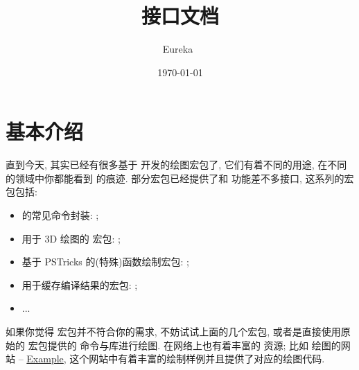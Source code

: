 \documentclass[
  hyper, 
  lang = cn, 
  class = l3doc,
  classOption={11pt},
  sect = {load=false},
]{../../zlatex/code/ztex}
\title{\texorpdfstring{\ztikz{}}{zTikZ} 接口文档}
\author{Eureka~\rlap{\wscale*{7.5em}{\normalfont\small\sffamily\color{gray}zongpingding5(at)outlook(dot)com}}}
\date{\textsf{\today}}
\begin{document}
\ExplSyntaxOn
{}
\ExplSyntaxOff
{}
  \maketitle
\restoregeometry
\restoregeometry
\fancyheadoffset{0pt}

\section{基本介绍}
直到今天, 其实已经有很多基于  开发的绘图宏包了, 它们有着不同的用途, 在不同的领域中你都能看到 \TikZ{} 的痕迹. 
部分宏包已经提供了和  功能差不多接口, 这系列的宏包包括:
\begin{itemize}
  \item  \TikZ{} 的常见命令封装: \href{https://ctan.org/tex-archive/graphics/pgf/contrib/tzplot}{};
  \item 用于 3D 绘图的 \TikZ{} 宏包: \href{https://ctan.org/pkg/tikz-3dplot}{};
  \item 基于 PSTricks 的(特殊)函数绘制宏包: \href{https://ctan.org/pkg/pst-func}{};
  \item 用于缓存编译结果的宏包: \href{https://github.com/leo-colisson/robust-externalize}{};
  \item ...
\end{itemize}


如果你觉得  宏包并不符合你的需求, 不妨试试上面的几个宏包, 或者是直接使用原始的  宏包提供的
命令与库进行绘图. 在网络上也有着丰富的 \TikZ{} 资源; 比如 \TikZ{} 绘图的网站 -- 
\href{https://texample.net/tikz/examples/}{\textcolor{black}{\TikZ} Example}, 这个网站中有着丰富的绘制样例并且提供了对应的绘图代码.
\end{document}
